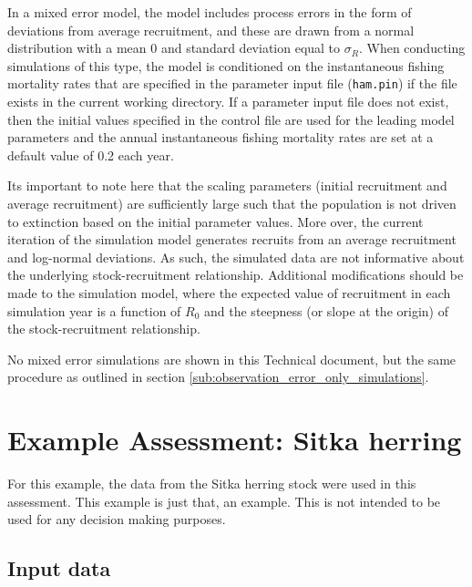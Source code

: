 \documentclass[12pt,letterpaper]{article}
\begin{document}
  In a mixed error model, the model includes process errors in the form of deviations from average recruitment, and these are drawn from a normal distribution with a mean 0 and standard deviation equal to $\sigma_R$.  When conducting simulations of this type, the model is conditioned on the instantaneous fishing mortality rates that are specified in the parameter input file (\texttt{ham.pin}) if the file exists in the current working directory. If a parameter input file does not exist, then the initial values specified in the control file are used for the leading model parameters and the annual instantaneous fishing mortality rates are set at a default value of 0.2 each year.

  Its important to note here that the scaling parameters (initial recruitment and average recruitment) are sufficiently large such that the population is not driven to extinction based on the initial parameter values.  More over, the current iteration of the simulation model generates recruits from an average recruitment and log-normal deviations.  As such, the simulated data are not informative about the underlying stock-recruitment relationship.  Additional modifications should be made to the simulation model, where the expected value of recruitment in each simulation year is a function of $R_0$ and the steepness (or slope at the origin) of the stock-recruitment relationship.

  No mixed error simulations are shown in this Technical document, but the same procedure as outlined in section \ref{sub:observation_error_only_simulations}.






  \section{Example Assessment: Sitka herring} %
  \label{sec:example_assessment_sitka_herring}
  
  For this example, the data from the Sitka herring stock were used in this assessment.  This example is just that, an example. This is not intended to be used for any decision making purposes.


  \subsection{Input data} %
  \label{sub:input_data}
  
\end{document}
